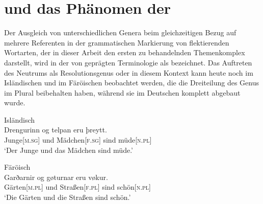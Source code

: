 \section{ und das Phänomen der }
\label{sec:einlgendres}

Der Ausgleich von unterschiedlichen Genera beim gleichzeitigen Bezug
auf mehrere Referenten in der grammatischen Markierung von flektierenden
Wortarten, der in dieser Arbeit den ersten zu behandelnden Themenkomplex
darstellt, wird in der von \citet{corbett1983} geprägten Terminologie als
 bezeichnet. Das Auftreten des Neutrums als
Resolutionsgenus oder  \autocites{corbett1999}{wechsler2009}
in diesem Kontext kann heute noch im Isländischen
 und im Färöischen 
beobachtet werden, die die Dreiteilung des Genus im Plural beibehalten haben,
während sie im Deutschen komplett abgebaut wurde.

\begin{exe}
\ex \label{ex:modgermbeide}
\begin{xlist}
\ex \label{ex:modgermbeide_1}
	\langinfo%
		{Isländisch}%
		{}%
		{\cites[nach][283]{corbett1991}[569]{wechsler2009}}\\
	\gll Drengurinn og telpan eru þreytt. \\
		Junge[\textsc{m.sg}] und Mädchen[\textsc{f.sg}] sind
		müde[\textsc{n.pl}] \\
	\trans `Der Junge und das Mädchen sind müde.'

\ex \label{ex:modgermbeide_2}
	\langinfo%
		{Färöisch}%
		{}%
		{\cite[nach][225]{thrainsson2004}}\\
	\gll Garðarnir og gøturnar eru vøkur. \\
		Gärten[\textsc{m.pl}] und Straßen[\textsc{f.pl}] sind
		schön[\textsc{n.pl}] \\
	\trans `Die Gärten und die Straßen sind schön.'
\end{xlist}
\end{exe}

